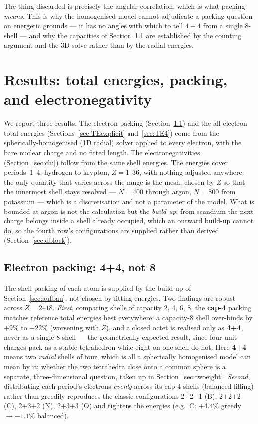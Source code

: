 \documentclass[11pt]{article}
\begin{document}
The thing discarded is precisely the angular correlation, which is what packing
\emph{means}. This is why the homogenised model cannot adjudicate a packing question on
energetic grounds --- it has no angles with which to tell $4{+}4$ from a single
$8$-shell --- and why the capacities of Section~\ref{sec:packing} are established by the
counting argument and the 3D solve rather than by the radial energies.

\section{Results: total energies, packing, and electronegativity}\label{sec:results}

We report three results. The electron packing (Section~\ref{sec:packing}) and the
all-electron total energies (Sections~\ref{sec:TEexplicit} and~\ref{sec:TE4})
come from the spherically-homogenised (1D radial) solver applied to every electron, with the
bare nuclear charge and no fitted length. The electronegativities
(Section~\ref{sec:chi}) follow from the same shell energies. The energies cover periods~1--4, hydrogen to
krypton, $Z=1$--$36$, with nothing adjusted anywhere: the only quantity that varies across the range
is the mesh, chosen by $Z$ so that the innermost shell stays resolved --- $N=400$ through argon,
$N=800$ from potassium --- which is a discretisation and not a parameter of the model. What is bounded at argon is not the calculation but the
\emph{build-up}: from scandium the next charge belongs inside a shell already occupied, which an
outward build-up cannot do, so the fourth row's configurations are supplied rather than derived
(Section~\ref{sec:dblock}).

\subsection{Electron packing: 4+4, not 8}\label{sec:packing}

The shell packing of each atom is supplied by the build-up of
Section~\ref{sec:aufbau}, not chosen by fitting energies. Two findings are
robust across $Z=2$--$18$. \emph{First}, comparing shells of capacity 2, 4, 6, 8,
the \textbf{cap-4} packing matches reference total energies best everywhere: a
capacity-8 shell over-binds by $+9\%$ to $+22\%$ (worsening with $Z$), and a closed
octet is realised only as \textbf{4+4}, never as a single 8-shell --- the
geometrically expected result, since four unit charges pack as a stable tetrahedron
while eight on one shell do not. Here \textbf{4+4} means two \emph{radial} shells of four,
which is all a spherically homogenised model can mean by it; whether the two tetrahedra close onto
a common sphere is a separate, three-dimensional question, taken up in
Section~\ref{sec:twoeight}. \emph{Second}, distributing each period's electrons
\emph{evenly} across its cap-4 shells (balanced filling) rather than greedily
reproduces the classic configurations 2+2+1 (B), 2+2+2 (C), 2+3+2 (N), 2+3+3 (O) and
tightens the energies (e.g.\ C: $+4.4\%$ greedy $\to -1.1\%$ balanced).
\end{document}
